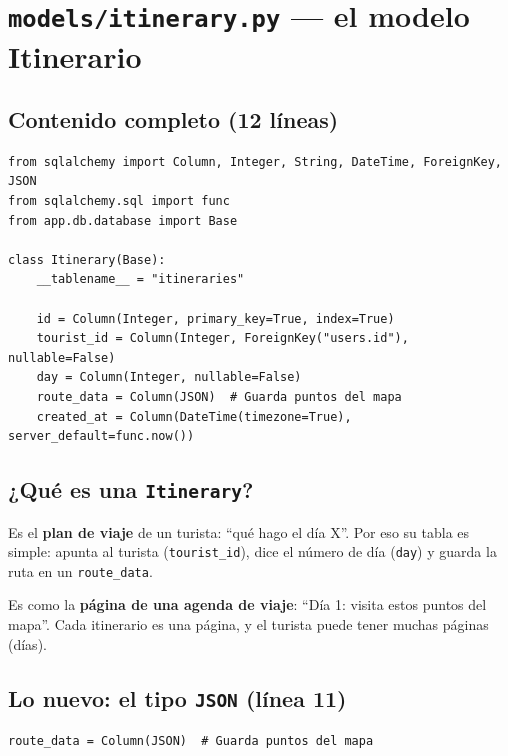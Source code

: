 \documentclass[11pt,a4paper]{article}
\begin{document}
\section{\texttt{models/itinerary.py} --- el modelo Itinerario}

\subsection{Contenido completo (12 líneas)}

\begin{lstlisting}
from sqlalchemy import Column, Integer, String, DateTime, ForeignKey, JSON
from sqlalchemy.sql import func
from app.db.database import Base

class Itinerary(Base):
    __tablename__ = "itineraries"

    id = Column(Integer, primary_key=True, index=True)
    tourist_id = Column(Integer, ForeignKey("users.id"), nullable=False)
    day = Column(Integer, nullable=False)
    route_data = Column(JSON)  # Guarda puntos del mapa
    created_at = Column(DateTime(timezone=True), server_default=func.now())
\end{lstlisting}

\subsection{¿Qué es una \texttt{Itinerary}?}

Es el \textbf{plan de viaje} de un turista: ``qué hago el día X''. Por eso su tabla es simple:
apunta al turista (\texttt{tourist\_id}), dice el número de día (\texttt{day}) y guarda
la ruta en un \texttt{route\_data}.

\begin{analogia}
Es como la \textbf{página de una agenda de viaje}: ``Día 1: visita estos puntos del mapa''.
Cada itinerario es una página, y el turista puede tener muchas páginas (días).
\end{analogia}

\subsection{Lo nuevo: el tipo \texttt{JSON} (línea 11)}

\begin{lstlisting}
route_data = Column(JSON)  # Guarda puntos del mapa
\end{lstlisting}
\end{document}
